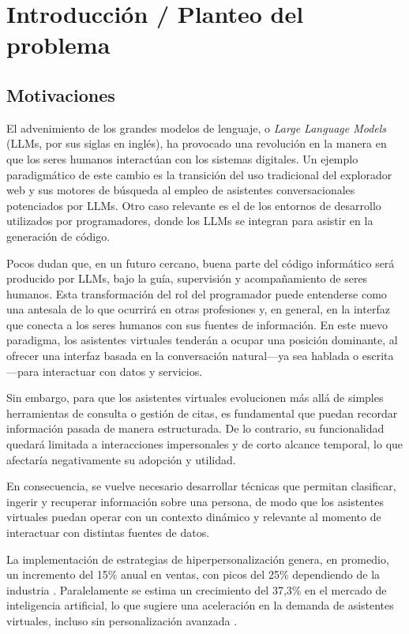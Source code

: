 \section{Introducción / Planteo del problema}

\subsection{Motivaciones}

El advenimiento de los grandes modelos de lenguaje, o \textit{Large Language Models} (LLMs, por sus siglas en inglés), ha provocado una revolución en la manera en que los seres humanos interactúan con los sistemas digitales. Un ejemplo paradigmático de este cambio es la transición del uso tradicional del explorador web y sus motores de búsqueda al empleo de asistentes conversacionales potenciados por LLMs. Otro caso relevante es el de los entornos de desarrollo utilizados por programadores, donde los LLMs se integran para asistir en la generación de código.

Pocos dudan que, en un futuro cercano, buena parte del código informático será producido por LLMs, bajo la guía, supervisión y acompañamiento de seres humanos. Esta transformación del rol del programador puede entenderse como una antesala de lo que ocurrirá en otras profesiones y, en general, en la interfaz que conecta a los seres humanos con sus fuentes de información. En este nuevo paradigma, los asistentes virtuales tenderán a ocupar una posición dominante, al ofrecer una interfaz basada en la conversación natural—ya sea hablada o escrita—para interactuar con datos y servicios.

Sin embargo, para que los asistentes virtuales evolucionen más allá de simples herramientas de consulta o gestión de citas, es fundamental que puedan recordar información pasada de manera estructurada. De lo contrario, su funcionalidad quedará limitada a interacciones impersonales y de corto alcance temporal, lo que afectaría negativamente su adopción y utilidad.

En consecuencia, se vuelve necesario desarrollar técnicas que permitan clasificar, ingerir y recuperar información sobre una persona, de modo que los asistentes virtuales puedan operar con un contexto dinámico y relevante al momento de interactuar con distintas fuentes de datos.

La implementación de estrategias de hiperpersonalización genera, en promedio, un incremento del 15\% anual en ventas, con picos del 25\% dependiendo de la industria \parencite{McKinsey2021}. Paralelamente se estima un crecimiento del 37,3\% en el mercado de inteligencia artificial, lo que sugiere una aceleración en la demanda de asistentes virtuales, incluso sin personalización avanzada \parencite{GrandViewResearch2023}.

